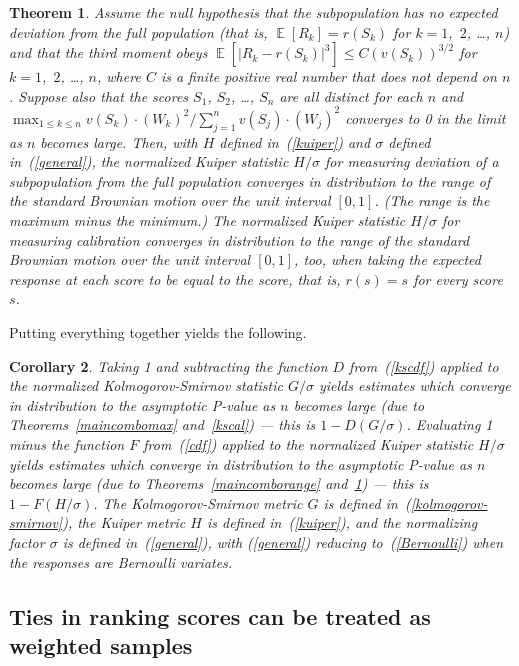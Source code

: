 \documentclass[12pt]{article}
\newtheorem{theorem}{Theorem}[]
\newtheorem{corollary}[theorem]{Corollary}
\DeclareMathOperator{\E}{\mathop{}\mathbb{E}}
\begin{document}
\begin{theorem}
\label{kucal}
Assume the null hypothesis that the subpopulation has no expected deviation
from the full population (that is, $\E[R_k] = r(S_k)$
for $k = 1$,~$2$, \dots, $n$) and that the third moment obeys
$\E[|R_k - r(S_k)|^3] \le C (v(S_k))^{3/2}$ for $k = 1$,~$2$, \dots, $n$,
where $C$ is a finite positive real number that does not depend on $n$.
Suppose also that the scores $S_1$, $S_2$, \dots, $S_n$ are all distinct
for each $n$ and
$\max_{1 \le k \le n} v(S_k) \cdot (W_k)^2 / \sum_{j=1}^n v(S_j) \cdot (W_j)^2$
converges to 0 in the limit as $n$ becomes large.
Then, with $H$ defined in~(\ref{kuiper})
and $\sigma$ defined in~(\ref{general}),
the normalized Kuiper statistic $H/\sigma$
for measuring deviation of a subpopulation from the full population
converges in distribution to the range of the standard Brownian motion
over the unit interval $[0, 1]$.
(The range is the maximum minus the minimum.)
The normalized Kuiper statistic $H/\sigma$ for measuring calibration
converges in distribution to the range of the standard Brownian motion
over the unit interval $[0, 1]$, too, when taking the expected response
at each score to be equal to the score, that is, $r(s) = s$
for every score $s$.
\end{theorem}

Putting everything together yields the following.
%
\begin{corollary}
\label{corollary}
Taking 1 and subtracting the function $D$ from~(\ref{kscdf})
applied to the normalized Kolmogorov-Smirnov statistic $G/\sigma$
yields estimates which converge in distribution to the asymptotic P-value
as $n$ becomes large (due to Theorems~\ref{maincombomax}
and~\ref{kscal}) --- this is $1 - D(G/\sigma)$.
Evaluating 1 minus the function $F$ from~(\ref{cdf})
applied to the normalized Kuiper statistic $H/\sigma$
yields estimates which converge in distribution to the asymptotic P-value
as $n$ becomes large (due to Theorems~\ref{maincomborange}
and~\ref{kucal}) --- this is $1 - F(H/\sigma)$.
The Kolmogorov-Smirnov metric $G$ is defined in~(\ref{kolmogorov-smirnov}),
the Kuiper metric $H$ is defined in~(\ref{kuiper}),
and the normalizing factor $\sigma$ is defined in~(\ref{general}),
with (\ref{general}) reducing to~(\ref{Bernoulli})
when the responses are Bernoulli variates.
\end{corollary}



\subsection{Ties in ranking scores can be treated as weighted samples}
\label{reduction}
\end{document}
